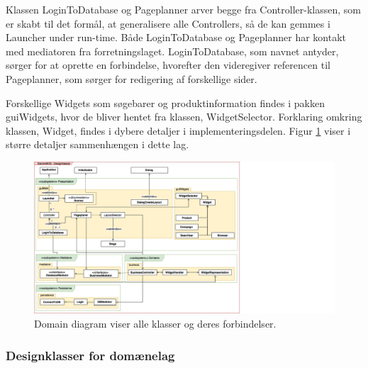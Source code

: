 Klassen LoginToDatabase og Pageplanner arver begge fra Controller-klassen, som er skabt til det formål, at generalisere alle Controllers, så de kan gemmes i Launcher under run-time. Både LoginToDatabase og Pageplanner har kontakt med mediatoren fra forretningslaget. LoginToDatabase, som navnet antyder, sørger for at oprette en forbindelse, hvorefter den videregiver referencen til Pageplanner, som sørger for redigering af forskellige sider.

Forskellige Widgets som søgebarer og produktinformation findes i pakken guiWidgets, hvor de bliver hentet fra klassen, WidgetSelector. Forklaring omkring klassen, Widget, findes i dybere detaljer i implementeringsdelen. Figur \ref{fig:domainDiagram} viser i større detaljer sammenhængen i dette lag.
    \begin{figure}[H]
      \includegraphics[width=26cm]{elaborationsdokumentet/figurer/design/DomainDiagram.png}
      \caption{Domain diagram viser alle klasser og deres forbindelser.}
      \label{fig:domainDiagram}
  \end{figure}

\FloatBarrier
\twocolumn

\subsubsection{Designklasser for domænelag}

